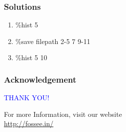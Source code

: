 \documentclass[presentation]{beamer}
\begin{document}
\begin{frame}
\frametitle{Solutions}
\label{sec-10}


\begin{enumerate}
\item \%hist 5
\item \%save filepath 2-5 7 9-11
\item \%hist 5 10
\end{enumerate}
\end{frame}
\begin{frame}
\frametitle{Acknowledgement}
\label{sec-11}

  \begin{block}{}
  \begin{center}
  \textcolor{blue}{\Large THANK YOU!} 
  \end{center}
  \end{block}
\begin{block}{}
  \begin{center}
    For more Information, visit our website\\
    \url{http://fossee.in/}
  \end{center}  
  \end{block}
\end{frame}
\end{document}
